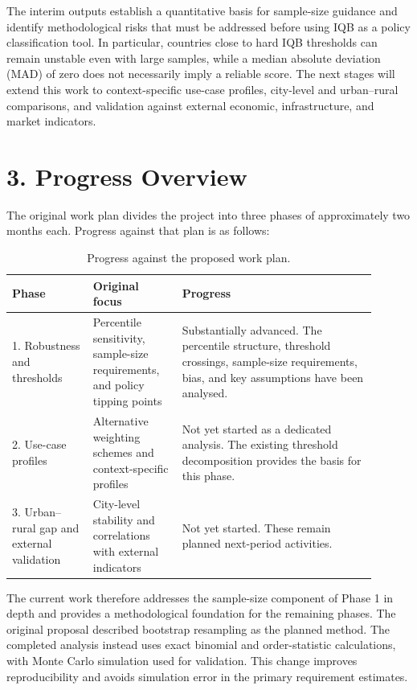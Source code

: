 \documentclass[11pt]{article}
\begin{document}
The interim outputs establish a quantitative basis for sample-size guidance and identify methodological
risks that must be addressed before using IQB as a policy classification tool. In particular, countries
close to hard IQB thresholds can remain unstable even with large samples, while a median absolute
deviation (MAD) of zero does not necessarily imply a reliable score. The next stages will extend this
work to context-specific use-case profiles, city-level and urban--rural comparisons, and validation
against external economic, infrastructure, and market indicators.

\section*{3. Progress Overview}

The original work plan divides the project into three phases of approximately two months each. Progress
against that plan is as follows:

\begin{table}[ht]
\centering
\caption{Progress against the proposed work plan.}
\begin{tabular}{p{0.20\linewidth}p{0.22\linewidth}p{0.48\linewidth}}
\toprule
Phase & Original focus & Progress \\
\midrule
1. Robustness and thresholds & Percentile sensitivity, sample-size requirements, and policy tipping points & Substantially advanced. The percentile structure, threshold crossings, sample-size requirements, bias, and key assumptions have been analysed. \\
2. Use-case profiles & Alternative weighting schemes and context-specific profiles & Not yet started as a dedicated analysis. The existing threshold decomposition provides the basis for this phase. \\
3. Urban--rural gap and external validation & City-level stability and correlations with external indicators & Not yet started. These remain planned next-period activities. \\
\bottomrule
\end{tabular}
\end{table}

The current work therefore addresses the sample-size component of Phase 1 in depth and provides a
methodological foundation for the remaining phases. The original proposal described bootstrap
resampling as the planned method. The completed analysis instead uses exact binomial and order-statistic
calculations, with Monte Carlo simulation used for validation. This change improves reproducibility and
avoids simulation error in the primary requirement estimates.
\end{document}
